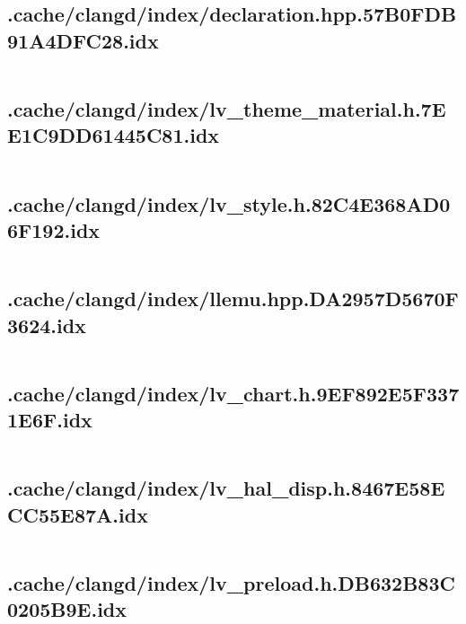 \subsection{.cache/clangd/index/declaration.hpp.57B0FDB91A4DFC28.idx}
\inputminted[linenos,tabsize=2,breaklines, breakanywhere]{c}{declaration.hpp.57B0FDB91A4DFC28.idx}
\pagebreak

\subsection{.cache/clangd/index/lv_theme_material.h.7EE1C9DD61445C81.idx}
\inputminted[linenos,tabsize=2,breaklines, breakanywhere]{c}{lv_theme_material.h.7EE1C9DD61445C81.idx}
\pagebreak

\subsection{.cache/clangd/index/lv_style.h.82C4E368AD06F192.idx}
\inputminted[linenos,tabsize=2,breaklines, breakanywhere]{c}{lv_style.h.82C4E368AD06F192.idx}
\pagebreak

\subsection{.cache/clangd/index/llemu.hpp.DA2957D5670F3624.idx}
\inputminted[linenos,tabsize=2,breaklines, breakanywhere]{c}{llemu.hpp.DA2957D5670F3624.idx}
\pagebreak

\subsection{.cache/clangd/index/lv_chart.h.9EF892E5F3371E6F.idx}
\inputminted[linenos,tabsize=2,breaklines, breakanywhere]{c}{lv_chart.h.9EF892E5F3371E6F.idx}
\pagebreak

\subsection{.cache/clangd/index/lv_hal_disp.h.8467E58ECC55E87A.idx}
\inputminted[linenos,tabsize=2,breaklines, breakanywhere]{c}{lv_hal_disp.h.8467E58ECC55E87A.idx}
\pagebreak

\subsection{.cache/clangd/index/lv_preload.h.DB632B83C0205B9E.idx}
\inputminted[linenos,tabsize=2,breaklines, breakanywhere]{c}{lv_preload.h.DB632B83C0205B9E.idx}
\pagebreak

